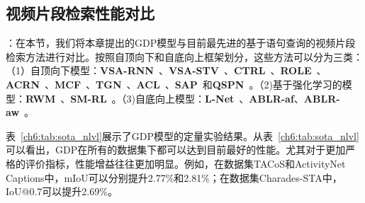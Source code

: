 \begin{table}[tbp]
    \centering
    \caption{不同基于视频查询的视频片段检索方法的性能对比}
    \label{ch6:tab:sota_vrl}
\end{table}


\subsection{视频片段检索性能对比}

\textbf{}：在本节，我们将本章提出的GDP模型与目前最先进的基于语句查询的视频片段检索方法进行对比。按照自顶向下和自底向上框架划分，这些方法可以分为三类：（1）自顶向下模型：\textbf{VSA-RNN}~\cite{gao2017tall}、\textbf{VSA-STV}~\cite{gao2017tall}、\textbf{CTRL}~\cite{gao2017tall}、\textbf{ROLE}~\cite{liu2018cross}、\textbf{ACRN}~\cite{liu2018attentive}、\textbf{MCF}~\cite{wu2018multi}、\textbf{TGN}~\cite{chen2018temporally}、\textbf{ACL}~\cite{ge2019mac}、\textbf{SAP}~\cite{chen2019semantic}和\textbf{QSPN}~\cite{xu2019multilevel}。（2)基于强化学习的模型：\textbf{RWM}~\cite{he2019read}、\textbf{SM-RL}~\cite{wang2019language}。（3)自底向上模型：\textbf{L-Net}~\cite{chen2019localizing}、\textbf{ABLR-af}、\textbf{ABLR-aw}~\cite{yuan2019find}。

表~\ref{ch6:tab:sota_nlvl}展示了GDP模型的定量实验结果。从表~\ref{ch6:tab:sota_nlvl}可以看出，GDP在所有的数据集下都可以达到目前最好的性能。尤其对于更加严格的评价指标，性能增益往往更加明显。例如，在数据集TACoS和ActivityNet Captions中，mIoU可以分别提升2.77\%和2.81\%；在数据集Charades-STA中，IoU@0.7可以提升2.69\%。


